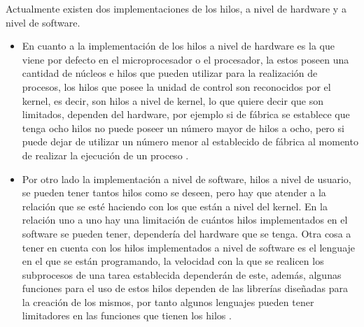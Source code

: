 \documentclass[12pt,letterpaper]{article}
\begin{document}
Actualmente existen dos implementaciones de los hilos, a nivel de hardware y a nivel de software. 
\begin{itemize}
    \item En cuanto a la implementación de los hilos a nivel de hardware es la que viene por defecto en el microprocesador o el procesador, la estos poseen una cantidad de núcleos e hilos que pueden utilizar para la realización de procesos, los hilos que posee la unidad de control son reconocidos por el kernel, es decir, son hilos a nivel de kernel, lo que quiere decir que son limitados, dependen del hardware, por ejemplo si de fábrica se establece que tenga ocho hilos no puede poseer un número mayor de hilos a ocho, pero si puede dejar de utilizar un número menor al establecido de fábrica al momento de realizar la ejecución de un proceso \cite{quora}.
    \item Por otro lado la implementación a nivel de software, hilos a nivel de usuario, se pueden tener tantos hilos como se deseen, pero hay que atender a la relación que se esté haciendo con los que están a nivel del kernel. En la relación uno a uno hay una limitación de cuántos hilos implementados en el software se pueden tener, dependería del hardware que se tenga. Otra cosa a tener en cuenta con los hilos implementados a nivel de software es el lenguaje en el que se están programando, la velocidad con la que se realicen los subprocesos de una tarea establecida dependerán de este, además, algunas funciones para el uso de estos hilos dependen de las librerías diseñadas para la creación de los mismos, por tanto algunos lenguajes pueden tener limitadores en las funciones que tienen los hilos \cite{stack}.
\end{itemize}


\newpage
\renewcommand\refname{Referencias}
%


\end{document}
